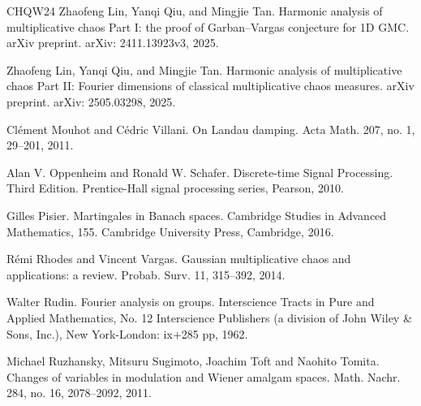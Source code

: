 \documentclass[12pt]{amsart}
\theoremstyle{definition}
\theoremstyle{remark}
\numberwithin{equation}{section}
\begin{document}
\begin{thebibliography}{CHQW24}
	Zhaofeng Lin, Yanqi Qiu, and Mingjie Tan.
	\newblock Harmonic analysis of multiplicative chaos Part I: the proof of Garban--Vargas conjecture for 1D GMC.
	\newblock arXiv preprint. arXiv: 2411.13923v3, 2025.
		
	Zhaofeng Lin, Yanqi Qiu, and Mingjie Tan.
	\newblock Harmonic analysis of multiplicative chaos Part II: Fourier dimensions of classical multiplicative chaos measures.
	\newblock arXiv preprint. arXiv: 2505.03298, 2025.

	Clément Mouhot and Cédric Villani.
	\newblock On Landau damping.
	\newblock Acta Math. 207, no. 1, 29--201, 2011.
	
	Alan V. Oppenheim and Ronald W. Schafer.
	\newblock Discrete-time Signal Processing.
	\newblock Third Edition. Prentice-Hall signal processing series, Pearson, 2010.

	Gilles Pisier.
	\newblock Martingales in Banach spaces.
	\newblock Cambridge Studies in Advanced Mathematics, 155. Cambridge University Press, Cambridge, 2016.
	
	R\'emi Rhodes and Vincent Vargas.
	\newblock Gaussian multiplicative chaos and applications: a review.
	\newblock Probab. Surv. 11, 315–392, 2014.
	
	Walter Rudin.
	\newblock Fourier analysis on groups.
	\newblock Interscience Tracts in Pure and Applied Mathematics, No. 12
	Interscience Publishers (a division of John Wiley \& Sons, Inc.), New York-London: ix+285 pp, 1962.
	
	Michael Ruzhansky, Mitsuru Sugimoto, Joachim Toft and Naohito Tomita.
	\newblock Changes of variables in modulation and Wiener amalgam spaces.
	\newblock Math. Nachr. 284, no. 16, 2078--2092, 2011.
		
\end{thebibliography}	
\end{document}
